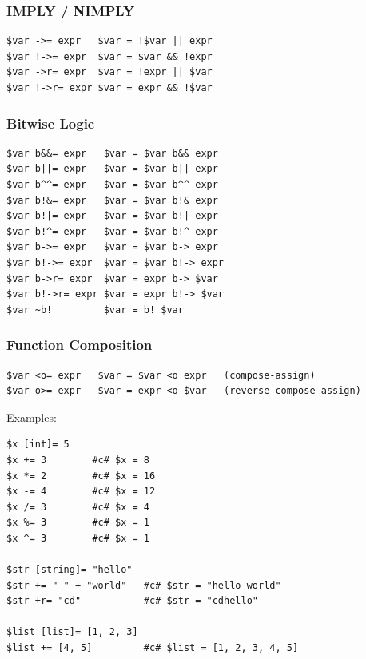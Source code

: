 \subsubsection{IMPLY / NIMPLY}
\begin{verbatim}
$var ->= expr   $var = !$var || expr
$var !->= expr  $var = $var && !expr
$var ->r= expr  $var = !expr || $var
$var !->r= expr $var = expr && !$var
\end{verbatim}

\subsubsection{Bitwise Logic}
\begin{verbatim}
$var b&&= expr   $var = $var b&& expr
$var b||= expr   $var = $var b|| expr
$var b^^= expr   $var = $var b^^ expr
$var b!&= expr   $var = $var b!& expr
$var b!|= expr   $var = $var b!| expr
$var b!^= expr   $var = $var b!^ expr
$var b->= expr   $var = $var b-> expr
$var b!->= expr  $var = $var b!-> expr
$var b->r= expr  $var = expr b-> $var
$var b!->r= expr $var = expr b!-> $var
$var ~b!         $var = b! $var
\end{verbatim}

\subsubsection{Function Composition}
\begin{verbatim}
$var <o= expr   $var = $var <o expr   (compose-assign)
$var o>= expr   $var = expr <o $var   (reverse compose-assign)
\end{verbatim}

Examples:
\begin{verbatim}
$x [int]= 5
$x += 3        #c# $x = 8
$x *= 2        #c# $x = 16
$x -= 4        #c# $x = 12
$x /= 3        #c# $x = 4
$x %= 3        #c# $x = 1
$x ^= 3        #c# $x = 1

$str [string]= "hello"
$str += " " + "world"   #c# $str = "hello world"
$str +r= "cd"           #c# $str = "cdhello"

$list [list]= [1, 2, 3]
$list += [4, 5]         #c# $list = [1, 2, 3, 4, 5]
\end{verbatim}

